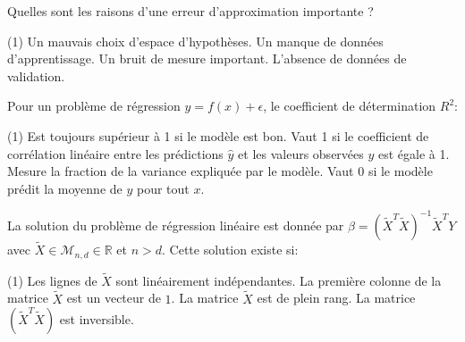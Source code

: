 \documentclass[solutions]{../cc}
\begin{document}
	\begin{question}
		Quelles sont les raisons d'une erreur d'approximation importante ?
		\begin{tasks}(1)
			\task Un mauvais choix d'espace d'hypothèses.
			\task Un manque de données d'apprentissage.
			\task Un bruit de mesure important.
			\task L'absence de données de validation.
		\end{tasks}
	\end{question}

	\begin{question}
		Pour un problème de régression $y = f(x) + \epsilon$, le coefficient de détermination $R^2$:
		\begin{tasks}(1)
			\task Est toujours supérieur à 1 si le modèle est bon.
			\task Vaut 1 si le coefficient de corrélation linéaire entre les prédictions $\hat{y}$ et les valeurs observées $y$ est égale à 1. 
			\task Mesure la fraction de la variance expliquée par le modèle.
			\task Vaut 0 si le modèle prédit la moyenne de $y$ pour tout $x$.
		\end{tasks}
	\end{question}

	\begin{question}
		La solution du problème de régression linéaire est donnée par $\hat{\beta} = (\tilde{X}^T \tilde{X})^{-1} \tilde{X}^T Y$ avec $\tilde{X} \in \mathcal{M}_{n,d} \in \mathbb{R}$ et $n > d$. Cette solution existe si:
		\begin{tasks}(1)
			\task Les lignes de $\tilde{X}$ sont linéairement indépendantes.
			\task La première colonne de la matrice $\tilde{X}$ est un vecteur de $1$.
			\task La matrice $\tilde{X}$ est de plein rang.
			\task La matrice $(\tilde{X}^T \tilde{X})$ est inversible.
		\end{tasks}
	\end{question}
\end{document}
